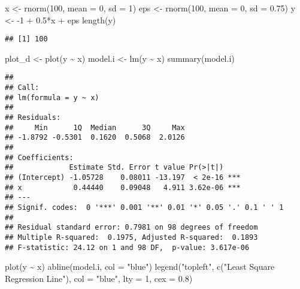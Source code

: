 \documentclass[
]{article}
\newenvironment{Shaded}{\begin{snugshade}}{\end{snugshade}}
\newcommand{\AttributeTok}[1]{\textcolor[rgb]{0.77,0.63,0.00}{#1}}
\newcommand{\DecValTok}[1]{\textcolor[rgb]{0.00,0.00,0.81}{#1}}
\newcommand{\FloatTok}[1]{\textcolor[rgb]{0.00,0.00,0.81}{#1}}
\newcommand{\FunctionTok}[1]{\textcolor[rgb]{0.00,0.00,0.00}{#1}}
\newcommand{\NormalTok}[1]{#1}
\newcommand{\OtherTok}[1]{\textcolor[rgb]{0.56,0.35,0.01}{#1}}
\newcommand{\SpecialCharTok}[1]{\textcolor[rgb]{0.00,0.00,0.00}{#1}}
\newcommand{\StringTok}[1]{\textcolor[rgb]{0.31,0.60,0.02}{#1}}
\begin{document}
\begin{Shaded}
\begin{Highlighting}[]
\NormalTok{x }\OtherTok{\textless{}{-}} \FunctionTok{rnorm}\NormalTok{(}\DecValTok{100}\NormalTok{, }\AttributeTok{mean =} \DecValTok{0}\NormalTok{, }\AttributeTok{sd =} \DecValTok{1}\NormalTok{)}
\NormalTok{eps }\OtherTok{\textless{}{-}} \FunctionTok{rnorm}\NormalTok{(}\DecValTok{100}\NormalTok{, }\AttributeTok{mean =} \DecValTok{0}\NormalTok{, }\AttributeTok{sd =} \FloatTok{0.75}\NormalTok{)}
\NormalTok{y }\OtherTok{\textless{}{-}} \SpecialCharTok{{-}}\DecValTok{1} \SpecialCharTok{+} \FloatTok{0.5}\SpecialCharTok{*}\NormalTok{x }\SpecialCharTok{+}\NormalTok{ eps}
\FunctionTok{length}\NormalTok{(y)}
\end{Highlighting}
\end{Shaded}

\begin{verbatim}
## [1] 100
\end{verbatim}

\begin{Shaded}
\begin{Highlighting}[]
\NormalTok{plot\_d }\OtherTok{\textless{}{-}} \FunctionTok{plot}\NormalTok{(y }\SpecialCharTok{\textasciitilde{}}\NormalTok{ x)}
\NormalTok{model.i }\OtherTok{\textless{}{-}} \FunctionTok{lm}\NormalTok{(y }\SpecialCharTok{\textasciitilde{}}\NormalTok{ x)}
\FunctionTok{summary}\NormalTok{(model.i)}
\end{Highlighting}
\end{Shaded}

\begin{verbatim}
## 
## Call:
## lm(formula = y ~ x)
## 
## Residuals:
##     Min      1Q  Median      3Q     Max 
## -1.8792 -0.5301  0.1620  0.5068  2.0126 
## 
## Coefficients:
##             Estimate Std. Error t value Pr(>|t|)    
## (Intercept) -1.05728    0.08011 -13.197  < 2e-16 ***
## x            0.44440    0.09048   4.911 3.62e-06 ***
## ---
## Signif. codes:  0 '***' 0.001 '**' 0.01 '*' 0.05 '.' 0.1 ' ' 1
## 
## Residual standard error: 0.7981 on 98 degrees of freedom
## Multiple R-squared:  0.1975, Adjusted R-squared:  0.1893 
## F-statistic: 24.12 on 1 and 98 DF,  p-value: 3.617e-06
\end{verbatim}

\begin{Shaded}
\begin{Highlighting}[]
\FunctionTok{plot}\NormalTok{(y }\SpecialCharTok{\textasciitilde{}}\NormalTok{ x)}
\FunctionTok{abline}\NormalTok{(model.i, }\AttributeTok{col =} \StringTok{"blue"}\NormalTok{)}
\FunctionTok{legend}\NormalTok{(}\StringTok{"topleft"}\NormalTok{, }\FunctionTok{c}\NormalTok{(}\StringTok{"Least Square Regression Line"}\NormalTok{), }\AttributeTok{col =} \StringTok{"blue"}\NormalTok{, }\AttributeTok{lty =} \DecValTok{1}\NormalTok{, }\AttributeTok{cex =} \FloatTok{0.8}\NormalTok{)}
\end{Highlighting}
\end{Shaded}
\end{document}

